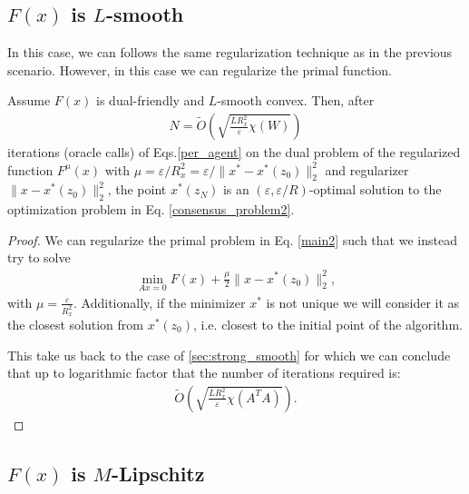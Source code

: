 \documentclass[final]{siamart1116}
\numberwithin{theorem}{section}
\begin{document}
	\subsection{$F(x)$ is \mbox{$L$-smooth}}
	
	In this case, we can follows the same regularization technique as in the previous scenario. However, in this case we can regularize the primal function.
	
	\begin{theorem}[Case $3$]\label{thm:case3}
		Assume $F(x)$ is dual-friendly and $L$-smooth convex. Then, after
		\begin{align*}
		N =\tilde O\left( \sqrt{\frac{ LR_x^2}{\varepsilon} \chi(W)} \right)
		\end{align*}
		iterations (oracle calls) of Eqs.\cref{per_agent} on the dual problem of the regularized function $F^\mu(x)$ with $\mu = \varepsilon / R_x^2 = \varepsilon / \|x^* - x^*(z_0)\|_2^2$ and regularizer $\|x - x^*(z_0)\|_2^2$, the point $x^*(z_N)$ is an \mbox{$(\varepsilon,\varepsilon/R )$-optimal} solution to the optimization problem in Eq. \eqref{consensus_problem2}.
	\end{theorem}
	
	\begin{proof}
		We can regularize the primal problem in Eq. \eqref{main2} such that we instead try to solve
		\begin{align*}
		\min_{Ax=0} F(x) + \frac{\mu}{2}\|x -x^*(z_0)\|_2^2,
		\end{align*}
		with $\mu = \frac{\varepsilon}{R^2_x}$. Additionally, if the minimizer $x^*$ is not unique we will consider it as the closest solution from $x^*(z_0)$, i.e. closest to the initial point of the algorithm.
		
		This take us back to the case of  \cref{sec:strong_smooth} for which we can conclude that up to logarithmic factor that the number of iterations required is:
		\begin{align}\label{result_smooth}
		\tilde{O}\left( \sqrt{\frac{L R_x^2}{\varepsilon}\chi(A^TA)}\right).
		\end{align}
	\end{proof}
	
	\subsection{$F(x)$ is $M$-Lipschitz}
	
\end{document}
